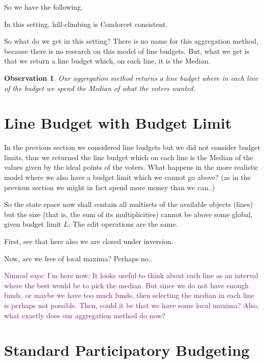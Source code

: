 \documentclass[sigconf]{aamas}  %
\newtheorem{observation}{Observation}
\newcommand{\nimrod}[1]{\textcolor{purple}{Nimrod says: #1}}
\begin{document}
So we have the following.

\begin{corollary}
  In this setting, hill-climbing is Condorcet consistent.
\end{corollary}

So what do we get in this setting?
There is no name for this aggregation method, because there is no research on this model of line budgets. But, what we get is that we return a line budget which, on each line, it is the Median.

\begin{observation}
Our aggregation method returns a line budget where in each line of the budget we spend the Median of what the voters wanted.
\end{observation}


\section{Line Budget with Budget Limit}

In the previous section we considered line budgets but we did not consider budget limits, thus we returned the line budget which on each line is the Median of the values given by the ideal points of the voters.
What happens in the more realistic model where we also have a budget limit which we cannot go above? (as in the previous section we might in fact spend more money than we can..)

So the state space now shall contain all multisets of the available objects (lines) but the size (that is, the sum of its multiplicities) cannot be above some global, given budget limit $L$. The edit operations are the same. 

First, see that here also we are closed under inversion.

Now, are we free of local maxima? Perhaps no..

\nimrod{I'm here now:
  It looks useful to think about each line as an interval where the best would be to pick the median. But since we do not have enough funds, or maybe we have too much funds, then selecting the median in each line is perhaps not possible. Then, could it be that we have some local maxima? Also, what exactly does our aggregation method do now?}


\section{Standard Participatory Budgeting}
\end{document}
